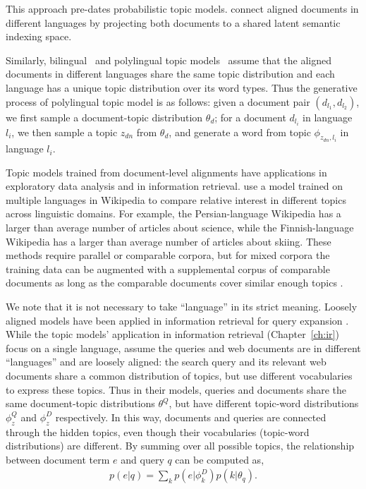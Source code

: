 This approach pre-dates probabilistic topic models.
\citet{Landauer-1990} connect aligned documents in different languages
by projecting both documents to a shared latent semantic indexing
space.

Similarly, bilingual~\citep{zhao-06} and polylingual topic models~\citep[\plda{}]{mimno-09}
assume that the aligned documents in different languages share the
same topic distribution and each language has a unique topic
distribution over its word types.
Thus the generative process of polylingual topic model is as follows:
given a document pair $(d_{l_1}, d_{l_2})$, we first sample a
document-topic distribution $\theta_d$; for a document $d_{l_i}$ in
language $l_i$, we then sample a topic $z_{dn}$ from $\theta_d$, and
generate a word from topic $\phi_{z_{dn}, l_i}$ in language $l_i$.

Topic models trained from document-level alignments have applications in exploratory data analysis and in information retrieval.
\citet{mimno-09} use a model trained on multiple languages in Wikipedia to compare relative interest in different topics across linguistic domains.
For example, the Persian-language Wikipedia has a larger than average number of articles about science, while the Finnish-language Wikipedia has a larger than average number of articles about skiing.
These methods require parallel or comparable corpora, but for mixed corpora the training data can be augmented with a supplemental corpus of comparable documents as long as  the comparable documents cover similar enough topics \citep{mimno-12b}.
 
We note that it is not necessary to take ``language'' in its strict meaning.
Loosely aligned models have been applied in information retrieval for query expansion \citep{Gao-2011,Gao-2012}. 
While the topic models' application in information retrieval (Chapter~\ref{ch:ir}) focus
on a single language, \cite{Gao-2011} assume the queries and web documents are in
different ``languages'' and are loosely aligned: the search query and its relevant web documents share a common distribution of
topics, but use different vocabularies to express these topics. Thus
in their models, queries and documents share the same document-topic
distributions $\theta^Q$, but have different topic-word distributions
$\phi_z^Q$ and $\phi_z^D$ respectively.
In this way, documents and queries are
connected through the hidden topics, even though their vocabularies
(topic-word distributions) are different. By summing over all possible
topics, the relationship between document term $e$ and query $q$ can
be computed as,
\begin{align}
p(e|q) = \sum_k p(e|\phi_k^D) p(k | \theta_q).
\end{align}

